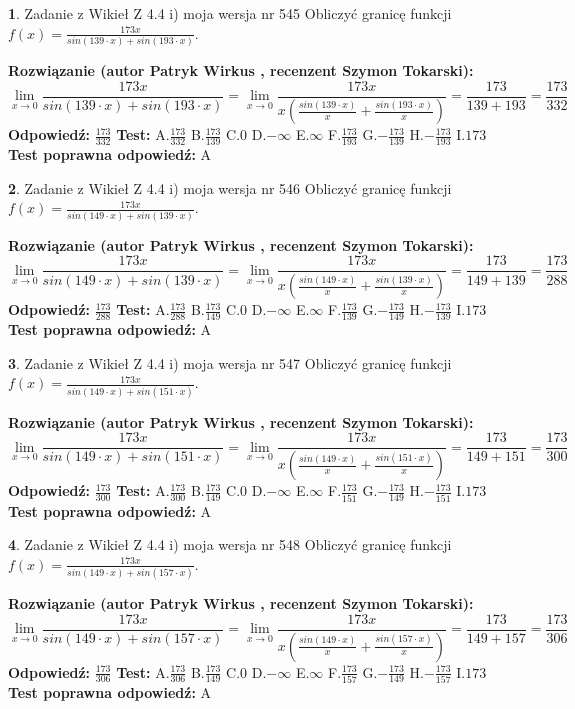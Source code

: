 \documentclass[12pt, a4paper]{article}
\theoremstyle{definition} %
\newtheorem{zad}{}
\newcommand{\zadStart}[1]{\begin{zad}#1\newline}
\newcommand{\zadStop}{\end{zad}}
\newcommand{\rozwStart}[2]{\noindent \textbf{Rozwiązanie (autor #1 , recenzent #2): }\newline}
\newcommand{\rozwStop}{\newline}
\newcommand{\odpStart}{\noindent \textbf{Odpowiedź:}\newline}
\newcommand{\odpStop}{\newline}
\newcommand{\testStart}{\noindent \textbf{Test:}\newline}
\newcommand{\testStop}{\newline}
\newcommand{\kluczStart}{\noindent \textbf{Test poprawna odpowiedź:}\newline}
\newcommand{\kluczStop}{\newline}
\begin{document}
\zadStart{Zadanie z Wikieł Z 4.4 i) moja wersja nr 545}
Obliczyć granicę funkcji $f(x)=\frac{173x}{sin(139\cdot x) +sin(193\cdot x)}$.
\zadStop
\rozwStart{Patryk Wirkus}{Szymon Tokarski}
$$\lim\limits_{x\to 0}\frac{173x}{sin(139\cdot x) +sin(193\cdot x)}=\lim\limits_{x\to 0}\frac{173x}{x(\frac{sin(139\cdot x)}{x}+\frac{sin(193\cdot x)}{x})}=\frac{173}{139+193} = \frac{173}{332}$$
\rozwStop
\odpStart
$\frac{173}{332}$
\odpStop
\testStart
A.$\frac{173}{332}$
B.$\frac{173}{139}$
C.$0$
D.$-\infty$
E.$\infty$
F.$\frac{173}{193}$
G.$-\frac{173}{139}$
H.$-\frac{173}{193}$
I.$173$
\testStop
\kluczStart
A
\kluczStop



\zadStart{Zadanie z Wikieł Z 4.4 i) moja wersja nr 546}
Obliczyć granicę funkcji $f(x)=\frac{173x}{sin(149\cdot x) +sin(139\cdot x)}$.
\zadStop
\rozwStart{Patryk Wirkus}{Szymon Tokarski}
$$\lim\limits_{x\to 0}\frac{173x}{sin(149\cdot x) +sin(139\cdot x)}=\lim\limits_{x\to 0}\frac{173x}{x(\frac{sin(149\cdot x)}{x}+\frac{sin(139\cdot x)}{x})}=\frac{173}{149+139} = \frac{173}{288}$$
\rozwStop
\odpStart
$\frac{173}{288}$
\odpStop
\testStart
A.$\frac{173}{288}$
B.$\frac{173}{149}$
C.$0$
D.$-\infty$
E.$\infty$
F.$\frac{173}{139}$
G.$-\frac{173}{149}$
H.$-\frac{173}{139}$
I.$173$
\testStop
\kluczStart
A
\kluczStop



\zadStart{Zadanie z Wikieł Z 4.4 i) moja wersja nr 547}
Obliczyć granicę funkcji $f(x)=\frac{173x}{sin(149\cdot x) +sin(151\cdot x)}$.
\zadStop
\rozwStart{Patryk Wirkus}{Szymon Tokarski}
$$\lim\limits_{x\to 0}\frac{173x}{sin(149\cdot x) +sin(151\cdot x)}=\lim\limits_{x\to 0}\frac{173x}{x(\frac{sin(149\cdot x)}{x}+\frac{sin(151\cdot x)}{x})}=\frac{173}{149+151} = \frac{173}{300}$$
\rozwStop
\odpStart
$\frac{173}{300}$
\odpStop
\testStart
A.$\frac{173}{300}$
B.$\frac{173}{149}$
C.$0$
D.$-\infty$
E.$\infty$
F.$\frac{173}{151}$
G.$-\frac{173}{149}$
H.$-\frac{173}{151}$
I.$173$
\testStop
\kluczStart
A
\kluczStop



\zadStart{Zadanie z Wikieł Z 4.4 i) moja wersja nr 548}
Obliczyć granicę funkcji $f(x)=\frac{173x}{sin(149\cdot x) +sin(157\cdot x)}$.
\zadStop
\rozwStart{Patryk Wirkus}{Szymon Tokarski}
$$\lim\limits_{x\to 0}\frac{173x}{sin(149\cdot x) +sin(157\cdot x)}=\lim\limits_{x\to 0}\frac{173x}{x(\frac{sin(149\cdot x)}{x}+\frac{sin(157\cdot x)}{x})}=\frac{173}{149+157} = \frac{173}{306}$$
\rozwStop
\odpStart
$\frac{173}{306}$
\odpStop
\testStart
A.$\frac{173}{306}$
B.$\frac{173}{149}$
C.$0$
D.$-\infty$
E.$\infty$
F.$\frac{173}{157}$
G.$-\frac{173}{149}$
H.$-\frac{173}{157}$
I.$173$
\testStop
\kluczStart
A
\kluczStop
\end{document}
